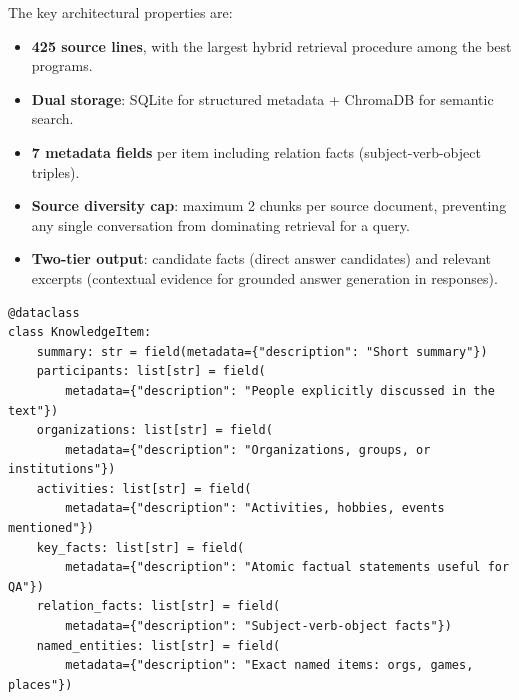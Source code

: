 The key architectural properties are:
\begin{itemize}
\item \textbf{425 source lines}, with the largest hybrid retrieval procedure among the best programs.
\item \textbf{Dual storage}: SQLite for structured metadata + ChromaDB for semantic search.
\item \textbf{7 metadata fields} per item including relation facts (subject-verb-object triples).
\item \textbf{Source diversity cap}: maximum 2 chunks per source document, preventing any single conversation from dominating retrieval for a query.
\item \textbf{Two-tier output}: candidate facts (direct answer candidates) and relevant excerpts (contextual evidence for grounded answer generation in responses).
\end{itemize}

\begin{lstlisting}[style=evolvedcode, caption={LoCoMo evolved schema --- 7 structured metadata fields.}, label=lst:loco-schema]
@dataclass
class KnowledgeItem:
    summary: str = field(metadata={"description": "Short summary"})
    participants: list[str] = field(
        metadata={"description": "People explicitly discussed in the text"})
    organizations: list[str] = field(
        metadata={"description": "Organizations, groups, or institutions"})
    activities: list[str] = field(
        metadata={"description": "Activities, hobbies, events mentioned"})
    key_facts: list[str] = field(
        metadata={"description": "Atomic factual statements useful for QA"})
    relation_facts: list[str] = field(
        metadata={"description": "Subject-verb-object facts"})
    named_entities: list[str] = field(
        metadata={"description": "Exact named items: orgs, games, places"})
\end{lstlisting}

